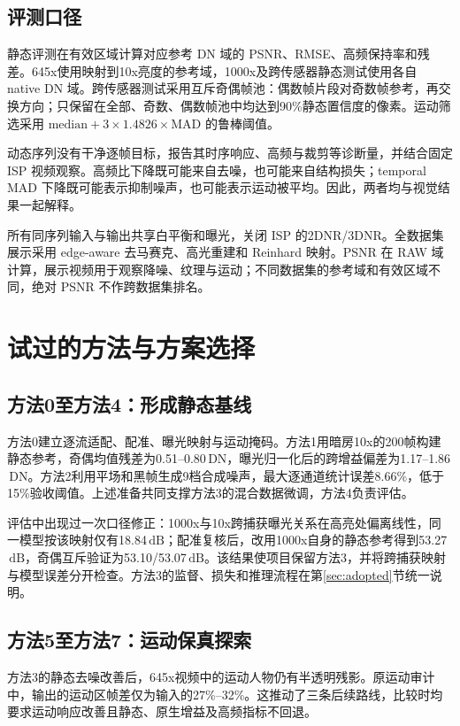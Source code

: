 \documentclass[11pt,a4paper,UTF8,fontset=fandol]{ctexart}
\newcommand{\dn}{\ensuremath{\,\mathrm{DN}}}
\newcommand{\db}{\ensuremath{\,\mathrm{dB}}}
\begin{document}
\subsection{评测口径}

静态评测在有效区域计算对应参考 DN 域的 PSNR、RMSE、高频保持率和残差。645x使用映射到10x亮度的参考域，1000x及跨传感器静态测试使用各自 native DN 域。跨传感器测试采用互斥奇偶帧池：偶数帧片段对奇数帧参考，再交换方向；只保留在全部、奇数、偶数帧池中均达到90\%静态置信度的像素。运动筛选采用 $\mathrm{median}+3\times1.4826\times\mathrm{MAD}$ 的鲁棒阈值。

动态序列没有干净逐帧目标，报告其时序响应、高频与裁剪等诊断量，并结合固定 ISP 视频观察。高频比下降既可能来自去噪，也可能来自结构损失；temporal MAD 下降既可能表示抑制噪声，也可能表示运动被平均。因此，两者均与视觉结果一起解释。

所有同序列输入与输出共享白平衡和曝光，关闭 ISP 的2DNR/3DNR。全数据集展示采用 edge-aware 去马赛克、高光重建和 Reinhard 映射。PSNR 在 RAW 域计算，展示视频用于观察降噪、纹理与运动；不同数据集的参考域和有效区域不同，绝对 PSNR 不作跨数据集排名。

\section{试过的方法与方案选择}
\label{sec:exploration}

\subsection{方法0至方法4：形成静态基线}

方法0建立逐流适配、配准、曝光映射与运动掩码。方法1用暗房10x的200帧构建静态参考，奇偶均值残差为0.51--0.80\dn，曝光归一化后的跨增益偏差为1.17--1.86\dn。方法2利用平场和黑帧生成9档合成噪声，最大逐通道统计误差8.66\%，低于15\%验收阈值。上述准备共同支撑方法3的混合数据微调，方法4负责评估。

评估中出现过一次口径修正：1000x与10x跨捕获曝光关系在高亮处偏离线性，同一模型按该映射仅有18.84\db；配准复核后，改用1000x自身的静态参考得到53.27\db，奇偶互斥验证为53.10/53.07\db。该结果使项目保留方法3，并将跨捕获映射与模型误差分开检查。方法3的监督、损失和推理流程在第\ref{sec:adopted}节统一说明。

\subsection{方法5至方法7：运动保真探索}

方法3的静态去噪改善后，645x视频中的运动人物仍有半透明残影。原运动审计中，输出的运动区帧差仅为输入的27\%--32\%。这推动了三条后续路线，比较时均要求运动响应改善且静态、原生增益及高频指标不回退。
\end{document}
